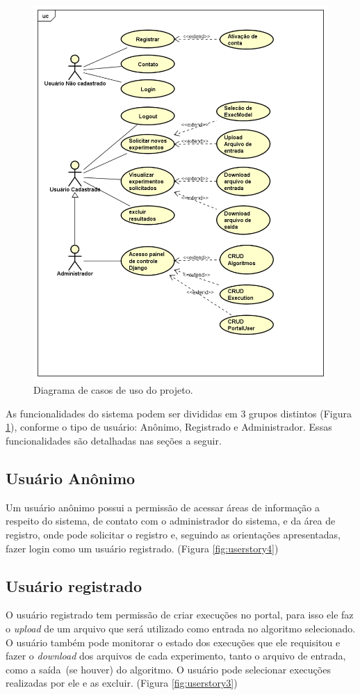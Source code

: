 \documentclass[tg]{mdtufsm}
\begin{document}
\begin{figure}
	\centering
	\includegraphics[width=1\textwidth]{UseCase_tg}
	\caption{
		Diagrama de casos de uso do projeto.
	}
	\label{fig:usecase}
\end{figure}

As funcionalidades do sistema podem ser divididas em 3 grupos distintos (Figura \ref{fig:usecase}), conforme o tipo de usuário: Anônimo, Registrado e Administrador. Essas funcionalidades são detalhadas nas seções a seguir.

\subsection{Usuário Anônimo}
Um usuário anônimo possui a permissão de acessar áreas de informação a respeito do sistema, de contato com o administrador do sistema, e da área de registro, onde pode solicitar o registro e, seguindo as orientações apresentadas, fazer login como um usuário registrado. (Figura \ref{fig:userstory4})
\subsection{Usuário registrado}
O usuário registrado tem permissão de criar execuções no portal, para isso ele faz o \emph{upload} de um arquivo que será utilizado como entrada no algoritmo selecionado. O usuário também pode monitorar o estado dos execuções que ele requisitou e fazer o \emph{download} dos arquivos de cada experimento, tanto o arquivo de entrada, como a saída~(se houver) do algoritmo. O usuário pode selecionar execuções realizadas por ele e as excluir. (Figura \ref{fig:userstory3})
\end{document}

